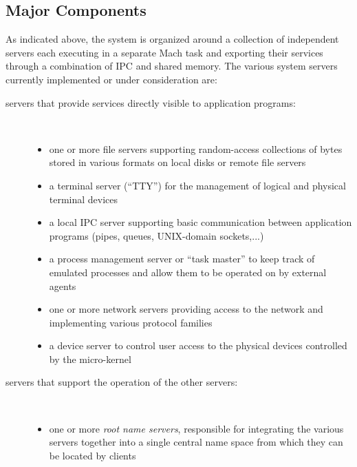 \subsection{Major Components}

As indicated above, the system is organized around a collection of
independent servers each executing in a separate Mach task and
exporting their services through a combination of IPC and shared
memory.  The various system servers currently implemented or under
consideration are:
\begin{description}
\item[servers that provide services directly visible to application
programs:] ~\ 

\begin{itemize}

\item one or more file servers sup\-porting random-access collections
of bytes stored in various formats on local disks or remote file
servers

\item a terminal server (``TTY'') for the management of logical and
physical terminal devices

\item a local IPC server supporting basic communication between
application programs (pipes, queues, UNIX-domain sockets,...)

\item a process management server or ``task master'' to keep track of
emulated processes and allow them to be operated on by external agents

\item one or more network servers providing access to the network and
implementing various protocol families

\item a device server to control user access to the physical devices
controlled by the micro-kernel

\end{itemize}

\item[servers that support the operation of the other servers:] ~\ 

\begin{itemize}

\item one or more {\em root name servers}, responsible for integrating
the various servers together into a single central name space from
which they can be located by clients


\end{itemize}
\end{description}
